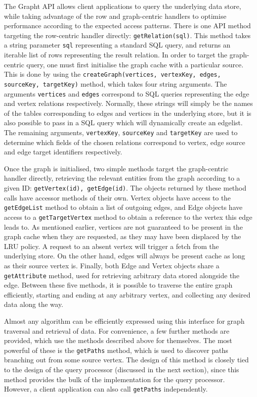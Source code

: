 The Grapht API allows client applications to query the underlying data store,
while  taking advantage of the row and graph-centric handlers to optimise
performance according to the expected access patterns. There is one API method
targeting the row-centric handler directly: \texttt{getRelation(sql)}. This
method takes a string parameter \texttt{sql} representing a standard SQL
query, and returns an iterable list of rows representing the result relation.
In order to target the graph-centric query, one must first initialise the
graph cache with a particular source. This is done by using the
\texttt{createGraph(vertices, vertexKey, edges, sourceKey, targetKey)} method, which
takes four string arguments. The arguments \texttt{vertices} and
\texttt{edges} correspond to SQL queries representing the edge and vertex
relations respectively. Normally, these strings will simply be the names of
the tables corresponding to edges and vertices in the underlying store, but it
is also possible to pass in a SQL query which will dynamically create an
edgelist. The remaining arguments, \texttt{vertexKey}, \texttt{sourceKey} and
\texttt{targetKey} are used to determine which fields of the chosen relations
correspond to  vertex, edge source and edge target identifiers respectively.

Once the graph is initialised, two simple methods target the graph-centric
handler directly, retrieving the relevant entities from the graph according to
a given ID: \texttt{getVertex(id), getEdge(id)}. The objects returned by these
method calls have accessor methods of their own. Vertex objects have access to
the \texttt{getEdgeList} method to obtain a list of outgoing edges, and Edge
objects have access to a \texttt{getTargetVertex} method to obtain a reference
to the vertex this edge leads to. As mentioned earlier, vertices are not
guaranteed to be present in the graph cache when they are requested, as they
may have been displaced by the LRU policy. A request to an absent vertex will
trigger a fetch from the underlying store. On the other hand, edges will
always be present cache as long as their source vertex is. Finally, both Edge
and Vertex objects share a \texttt{getAttribute} method, used for retrieving
arbitrary data stored alongside the edge. Between these five methods, it is
possible to traverse the entire graph efficiently, starting and ending at any
arbitrary vertex, and collecting any desired data along the way.

Almost any algorithm can be efficiently expressed using this interface for
graph traversal and retrieval of data. For convenience, a few further methods
are provided, which use the methods described above for themselves. The most
powerful of these is the \texttt{getPaths} method, which is used to discover
paths branching out from some source vertex. The design of this method is
closely tied to the design of the query processor (discussed in the next
section), since this method provides the bulk of the implementation for the
query processor. However, a client application can also call \texttt{getPaths}
independently.


